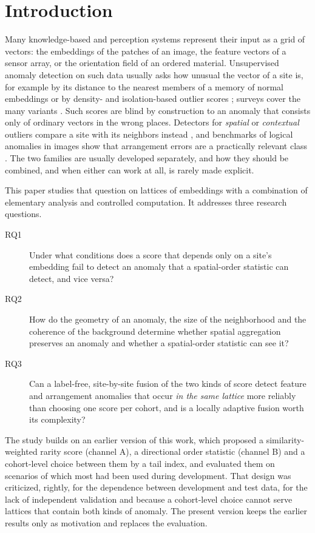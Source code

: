 \documentclass[preprint,review,12pt]{elsarticle}
\begin{document}
\section{Introduction}
Many knowledge-based and perception systems represent their input as a grid of vectors: the embeddings of the patches of an image, the feature vectors of a sensor array, or the orientation field of an ordered material. Unsupervised anomaly detection on such data usually asks how unusual the vector of a site is, for example by its distance to the nearest members of a memory of normal embeddings \citep{Roth2022,Defard2021} or by density- and isolation-based outlier scores \citep{Breunig2000,Liu2008}; surveys cover the many variants \citep{Chandola2009,Ruff2021,Pang2021,Aggarwal2017}. Such scores are blind by construction to an anomaly that consists only of ordinary vectors in the wrong places. Detectors for \emph{spatial} or \emph{contextual} outliers compare a site with its neighbors instead \citep{Shekhar2003,Song2007,Schubert2014}, and benchmarks of logical anomalies in images show that arrangement errors are a practically relevant class \citep{Bergmann2022}. The two families are usually developed separately, and how they should be combined, and when either can work at all, is rarely made explicit.

This paper studies that question on lattices of embeddings with a combination of elementary analysis and controlled computation. It addresses three research questions.
\begin{description}
\item[RQ1] Under what conditions does a score that depends only on a site's embedding fail to detect an anomaly that a spatial-order statistic can detect, and vice versa?
\item[RQ2] How do the geometry of an anomaly, the size of the neighborhood and the coherence of the background determine whether spatial aggregation preserves an anomaly and whether a spatial-order statistic can see it?
\item[RQ3] Can a label-free, site-by-site fusion of the two kinds of score detect feature and arrangement anomalies that occur \emph{in the same lattice} more reliably than choosing one score per cohort, and is a locally adaptive fusion worth its complexity?
\end{description}

The study builds on an earlier version of this work, which proposed a similarity-weighted rarity score (channel A), a directional order statistic (channel B) and a cohort-level choice between them by a tail index, and evaluated them on scenarios of which most had been used during development. That design was criticized, rightly, for the dependence between development and test data, for the lack of independent validation and because a cohort-level choice cannot serve lattices that contain both kinds of anomaly. The present version keeps the earlier results only as motivation and replaces the evaluation.
\end{document}
